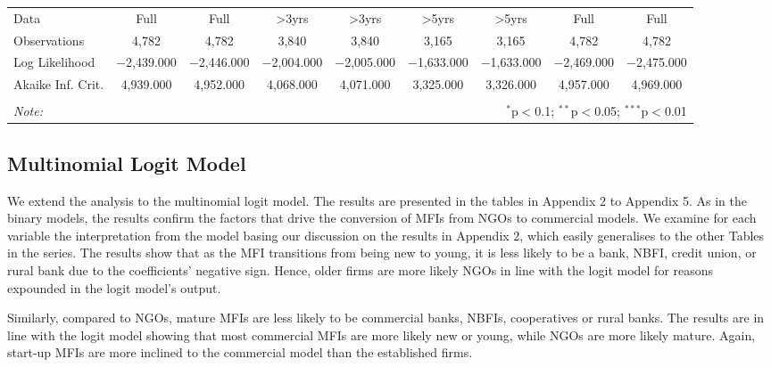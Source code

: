 \documentclass[a4paper, nobind]{templates/ociamthesis}
\begin{document}
\begin{landscape}
\begin{table}[!htbp]
\begin{tabular}{@{\extracolsep{5pt}}lcccccccc}
Data & Full & Full & >3yrs & >3yrs & >5yrs & >5yrs & Full & Full \\ 
Observations & 4,782 & 4,782 & 3,840 & 3,840 & 3,165 & 3,165 & 4,782 & 4,782 \\ 
Log Likelihood & $-$2,439.000 & $-$2,446.000 & $-$2,004.000 & $-$2,005.000 & $-$1,633.000 & $-$1,633.000 & $-$2,469.000 & $-$2,475.000 \\ 
Akaike Inf. Crit. & 4,939.000 & 4,952.000 & 4,068.000 & 4,071.000 & 3,325.000 & 3,326.000 & 4,957.000 & 4,969.000 \\ 
\hline 
\hline \\[-1.8ex] 
\textit{Note:}  & \multicolumn{8}{r}{$^{*}$p$<$0.1; $^{**}$p$<$0.05; $^{***}$p$<$0.01} \\ 
\end{tabular} 
\end{table}

\end{landscape}

\newpage

\hypertarget{multinomial-logit-model}{%
\subsection{Multinomial Logit Model}\label{multinomial-logit-model}}

We extend the analysis to the multinomial logit model. The results are presented in the tables in Appendix 2 to Appendix 5. As in the binary models, the results confirm the factors that drive the conversion of MFIs from NGOs to commercial models. We examine for each variable the interpretation from the model basing our discussion on the results in Appendix 2, which easily generalises to the other Tables in the series. The results show that as the MFI transitions from being new to young, it is less likely to be a bank, NBFI, credit union, or rural bank due to the coefficients' negative sign. Hence, older firms are more likely NGOs in line with the logit model for reasons expounded in the logit model's output.

Similarly, compared to NGOs, mature MFIs are less likely to be commercial banks, NBFIs, cooperatives or rural banks. The results are in line with the logit model showing that most commercial MFIs are more likely new or young, while NGOs are more likely mature. Again, start-up MFIs are more inclined to the commercial model than the established firms.
\end{document}
